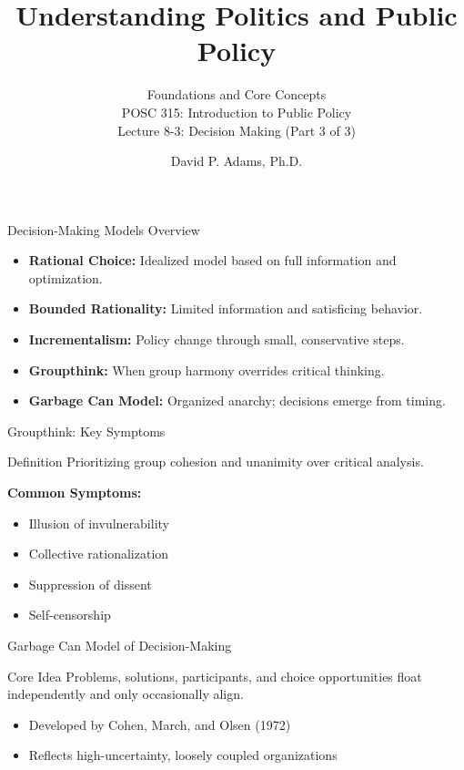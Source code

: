 \documentclass[10pt]{beamer}
\begin{document}
\title{Understanding Politics and Public Policy}
\subtitle{Foundations and Core Concepts \\ POSC 315: Introduction to Public Policy \\ Lecture 8-3: Decision Making (Part 3 of 3)}
\date{David P. Adams, Ph.D.}

\maketitle

\begin{frame}{Decision-Making Models Overview}
\begin{itemize}
  \item \textbf{Rational Choice:} Idealized model based on full information and optimization.
  \item \textbf{Bounded Rationality:} Limited information and satisficing behavior.
  \item \textbf{Incrementalism:} Policy change through small, conservative steps.
  \item \textbf{Groupthink:} When group harmony overrides critical thinking.
  \item \textbf{Garbage Can Model:} Organized anarchy; decisions emerge from timing.
\end{itemize}
\end{frame}

\begin{frame}{Groupthink: Key Symptoms}
\begin{block}{Definition}
Prioritizing group cohesion and unanimity over critical analysis.
\end{block}
\vspace{0.5cm}
\textbf{Common Symptoms:}
\begin{itemize}
  \item Illusion of invulnerability
  \item Collective rationalization
  \item Suppression of dissent
  \item Self-censorship
\end{itemize}
\end{frame}

\begin{frame}{Garbage Can Model of Decision-Making}
\begin{block}{Core Idea}
Problems, solutions, participants, and choice opportunities float independently and only occasionally align.
\end{block}
\begin{itemize}
  \item Developed by Cohen, March, and Olsen (1972)
  \item Reflects high-uncertainty, loosely coupled organizations
\end{itemize}
\end{frame}
\end{document}

